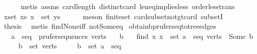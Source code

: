 \begin{isabellebody}
\ \ \ \ \isamarkupfalse%
\ {\isacharparenleft}{\kern0pt}metis\ assms\ card{\isacharunderscore}{\kern0pt}length\ distinct{\isacharunderscore}{\kern0pt}card\ le{\isacharunderscore}{\kern0pt}neq{\isacharunderscore}{\kern0pt}implies{\isacharunderscore}{\kern0pt}less\ order{\isacharunderscore}{\kern0pt}less{\isacharunderscore}{\kern0pt}trans{\isacharparenright}{\kern0pt}\isanewline
\ \ \isamarkupfalse%
\ \isamarkupfalse%
\ {\isachardoublequoteopen}{\isasymexists}x{\isasymin}set\ xs{\isachardot}{\kern0pt}\ x\ {\isasymnotin}\ set\ ys{\isachardoublequoteclose}\isanewline
\ \ \ \ \isamarkupfalse%
\ {\isacharparenleft}{\kern0pt}meson\ finite{\isacharunderscore}{\kern0pt}set\ card{\isacharunderscore}{\kern0pt}subset{\isacharunderscore}{\kern0pt}not{\isacharunderscore}{\kern0pt}gt{\isacharunderscore}{\kern0pt}card\ subsetI{\isacharparenright}{\kern0pt}\isanewline
\ \ \isamarkupfalse%
\ \isamarkupfalse%
\ {\isacharquery}{\kern0pt}thesis\ \isamarkupfalse%
\ {\isacharparenleft}{\kern0pt}metis\ find{\isacharunderscore}{\kern0pt}None{\isacharunderscore}{\kern0pt}iff{}\ not{\isacharunderscore}{\kern0pt}Some{\isacharunderscore}{\kern0pt}eq{\isacharparenright}{\kern0pt}\isanewline
{}\isamarkupfalse%
%
\endisatagproof
{\isafoldproof}%
%
\isadelimproof
\isanewline
%
\endisadelimproof
\isanewline
{}\isamarkupfalse%
\ obtain{\isacharunderscore}{\kern0pt}b{\isacharunderscore}{\kern0pt}prufer{\isacharunderscore}{\kern0pt}seq{\isacharunderscore}{\kern0pt}to{\isacharunderscore}{\kern0pt}tree{\isacharunderscore}{\kern0pt}edges{\isacharcolon}{\kern0pt}\isanewline
\ \ \ {\isachardoublequoteopen}{\isacharparenleft}{\kern0pt}a\ {\isacharhash}{\kern0pt}\ seq{\isacharparenright}{\kern0pt}\ {\isasymin}\ prufer{\isacharunderscore}{\kern0pt}sequences\ verts{\isachardoublequoteclose}\isanewline
\ \ \ b\isanewline
\ \ \ {\isachardoublequoteopen}find\ {\isacharparenleft}{\kern0pt}{\isasymlambda}x{\isachardot}{\kern0pt}\ x\ {\isasymnotin}\ set\ {\isacharparenleft}{\kern0pt}a\ {\isacharhash}{\kern0pt}\ seq{\isacharparenright}{\kern0pt}{\isacharparenright}{\kern0pt}\ verts\ {\isacharequal}{\kern0pt}\ Some\ b{\isachardoublequoteclose}\isanewline
\ \ \ \ \ {\isachardoublequoteopen}b\ {\isasymin}\ set\ verts{\isachardoublequoteclose}\isanewline
\ \ \ \ \ {\isachardoublequoteopen}b\ {\isasymnotin}\ set\ {\isacharparenleft}{\kern0pt}a\ {\isacharhash}{\kern0pt}\ seq{\isacharparenright}{\kern0pt}{\isachardoublequoteclose}\isanewline

\end{isabellebody}
